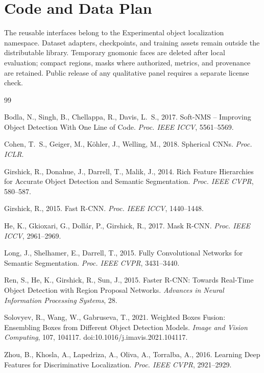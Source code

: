 \documentclass[a4paper,9pt]{extarticle}
\begin{document}
\section*{Code and Data Plan}

The reusable interfaces belong to the Experimental object localization namespace. Dataset adapters, checkpoints, and training assets remain outside the distributable library. Temporary gnomonic faces are deleted after local evaluation; compact regions, masks where authorized, metrics, and provenance are retained. Public release of any qualitative panel requires a separate license check.

\balance
\begin{thebibliography}{99}

Bodla, N., Singh, B., Chellappa, R., Davis, L.~S., 2017.
Soft-NMS -- Improving Object Detection With One Line of Code.
\emph{Proc. IEEE ICCV}, 5561--5569.

Cohen, T.~S., Geiger, M., K{\"o}hler, J., Welling, M., 2018.
Spherical CNNs. \emph{Proc. ICLR}.

Girshick, R., Donahue, J., Darrell, T., Malik, J., 2014.
Rich Feature Hierarchies for Accurate Object Detection and Semantic Segmentation.
\emph{Proc. IEEE CVPR}, 580--587.

Girshick, R., 2015.
Fast R-CNN. \emph{Proc. IEEE ICCV}, 1440--1448.

He, K., Gkioxari, G., Doll{\'a}r, P., Girshick, R., 2017.
Mask R-CNN. \emph{Proc. IEEE ICCV}, 2961--2969.

Long, J., Shelhamer, E., Darrell, T., 2015.
Fully Convolutional Networks for Semantic Segmentation.
\emph{Proc. IEEE CVPR}, 3431--3440.

Ren, S., He, K., Girshick, R., Sun, J., 2015.
Faster R-CNN: Towards Real-Time Object Detection with Region Proposal Networks.
\emph{Advances in Neural Information Processing Systems}, 28.

Solovyev, R., Wang, W., Gabruseva, T., 2021.
Weighted Boxes Fusion: Ensembling Boxes from Different Object Detection Models.
\emph{Image and Vision Computing}, 107, 104117.
doi:10.1016/j.imavis.2021.104117.

Zhou, B., Khosla, A., Lapedriza, A., Oliva, A., Torralba, A., 2016.
Learning Deep Features for Discriminative Localization.
\emph{Proc. IEEE CVPR}, 2921--2929.

\end{thebibliography}
\end{document}
